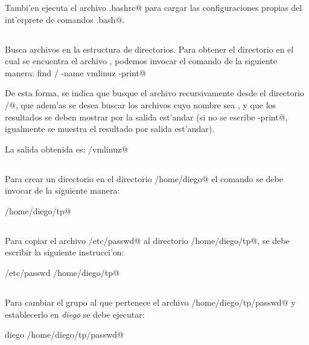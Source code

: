 			Tambi'en ejecuta el archivo \verb@.bashrc@ para cargar las configuraciones propias del int'erprete de comandos \verb@.bash@.

		\subsection{}
		  Busca archivos en la estructura de directorios.
			Para obtener el directorio en el cual se encuentra el archivo \verb@vmlinuz@, podemos invocar el comando \verb@find@ de la siguiente manera:
			\verb@sudo find / -name vmlinuz -print@
			
			De esta forma, se indica que busque el archivo recursivamente desde el directorio \verb@/@, que adem'as se desea buscar los archivos cuyo nombre sea \verb@vmlinuz@, y que los resultados se deben mostrar por la salida est'andar (si no se escribe \verb@-print@, igualmente se muestra el resultado por salida est'andar).
			
			La salida obtenida es:
			\verb@/vmlinuz@

		\subsection{}
			Para crear un directorio en el directorio \verb@/home/diego@ el comando se debe invocar de la siguiente manera:

			\verb@mkdir /home/diego/tp@

		\subsection{}
		
			Para copiar el archivo \verb@/etc/passwd@ al directorio \verb@/home/diego/tp@, se debe escribir la siguiente instrucci'on:

			\verb@cp /etc/passwd /home/diego/tp@
		
		\subsection{}

			Para cambiar el grupo al que pertenece el archivo \verb@/home/diego/tp/passwd@ y establecerlo en \emph{diego} se debe ejecutar:

			\verb@chgrp diego /home/diego/tp/passwd@

		\subsection{}

